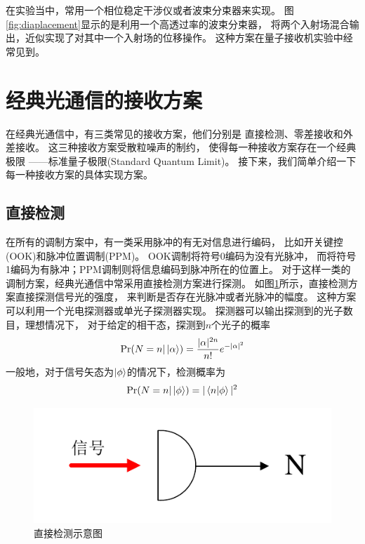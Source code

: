 在实验当中，常用一个相位稳定干涉仪或者波束分束器来实现\cite{cook2007optical,becerra2013experimental,lau2006binary,paris1996displacement}。
图\ref{fig:diaplacement}显示的是利用一个高透过率的波束分束器，
将两个入射场混合输出，近似实现了对其中一个入射场的位移操作。
这种方案在量子接收机实验中经常见到。

\section{经典光通信的接收方案}

在经典光通信中，有三类常见的接收方案，他们分别是
直接检测、零差接收和外差接收。
这三种接收方案受散粒噪声的制约，
使得每一种接收方案存在一个经典极限
——标准量子极限(Standard Quantum Limit)。
接下来，我们简单介绍一下每一种接收方案的具体实现方案。

\subsection{直接检测}

在所有的调制方案中，有一类采用脉冲的有无对信息进行编码，
比如开关键控(OOK)和脉冲位置调制(PPM)。
OOK调制将符号0编码为没有光脉冲，
而将符号1编码为有脉冲；PPM调制则将信息编码到脉冲所在的位置上。
对于这样一类的调制方案，经典光通信中常采用直接检测方案进行探测。
如图\ref{fig:DD}所示，直接检测方案直接探测信号光的强度，
来判断是否存在光脉冲或者光脉冲的幅度\cite{gagliardi1976optical,gagliardi1998optical}。
这种方案可以利用一个光电探测器或单光子探测器实现。
探测器可以输出探测到的光子数目，理想情况下，
对于给定的相干态，探测到$n$个光子的概率
\begin{equation}
\Pr(N = n| \ket{\alpha}) = \frac{|\alpha|^{2n}}{n!} e^{-|\alpha|^2}
\label{eq:dd-prob}
\end{equation}
一般地，对于信号矢态为$\ket{\phi}$的情况下，检测概率为
\begin{equation}
\Pr(N = n| \ket{\phi}) = |\bra{n}\ket{\phi}|^2
\end{equation}



\begin{figure}
\centering
  \includegraphics[scale=1]{figures/chap2/DD.pdf}
  \caption{直接检测示意图}
  \label{fig:DD}
\end{figure}


